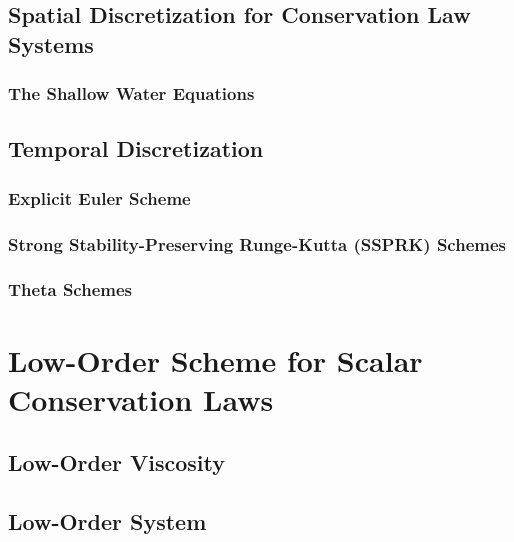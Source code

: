 \subsection{Spatial Discretization for Conservation Law Systems
  \label{sec:spatial_discretization_system}}
  
  \subsubsection{The Shallow Water Equations
    \label{sec:spatial_discretization_shallowwater}}
    
\subsection{Temporal Discretization\label{sec:temporal_discretization}}
  \subsubsection{Explicit Euler Scheme\label{sec:explicit_euler}}
    
  \subsubsection{Strong Stability-Preserving Runge-Kutta (SSPRK)
    Schemes\label{sec:ssprk}}
    
  \subsubsection{Theta Schemes\label{sec:theta}}
    
\section{Low-Order Scheme for Scalar Conservation Laws}\label{sec:low_order_scalar}

\subsection{Low-Order Viscosity\label{sec:low_order_viscosity_scalar}}
  
\subsection{Low-Order System\label{sec:low_order_scheme_scalar}}
  
